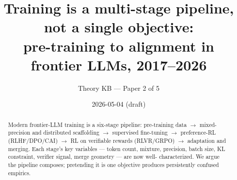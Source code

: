 








\title{
  Training is a multi-stage pipeline, not a single objective: \\
  pre-training to alignment in frontier LLMs, 2017--2026
}
\author{Theory KB --- Paper 2 of 5}
\date{2026-05-04 (draft)}


\maketitle

\begin{abstract}
Modern frontier-LLM training is a six-stage pipeline: pre-training data
$\to$ mixed-precision and distributed scaffolding $\to$ supervised
fine-tuning $\to$ preference-RL (RLHF/DPO/CAI) $\to$ RL on verifiable
rewards (RLVR/GRPO) $\to$ adaptation and merging. Each stage's
key variables --- token count, mixture, precision, batch size,
KL constraint, verifier signal, merge geometry --- are now well-
characterized. We argue the pipeline composes; pretending it is one
objective produces persistently confused empirics.
\end{abstract}

\tableofcontents




















